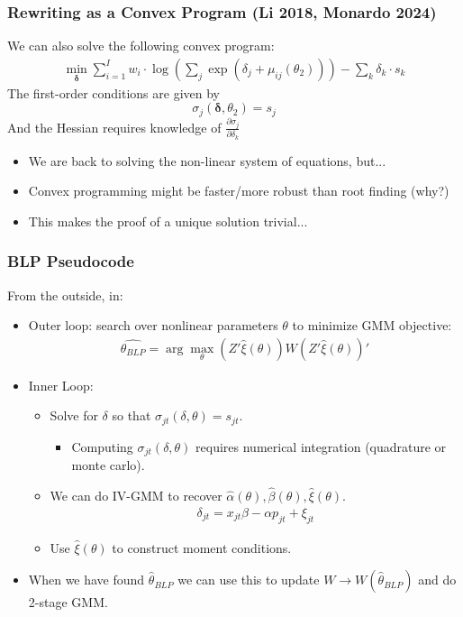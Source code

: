 \documentclass[aspectratio=169,10pt]{beamer}
\begin{document}
 \begin{frame}
\frametitle{Rewriting as a Convex Program (Li 2018, Monardo 2024)}
We can also solve the following convex program:
\begin{align*}
    \min_{\symbf{\delta}}  \sum_{i=1}^I w_i \cdot \log \left(\sum_{j} \exp\left(\delta_j  + \mu_{ij}(\theta_2) \right) \right) - \sum_k \delta_k \cdot s_{k}
\end{align*}
The first-order conditions are given by
$$\sigma_j(\symbf{\delta},\theta_2) = s_j$$
And the Hessian requires knowledge of $\frac{\partial \sigma_{j}}{\partial \delta_{k}}$
\begin{itemize}
    \item We are back to solving the non-linear system of equations, but...
    \item Convex programming might be faster/more robust than root finding (why?)
    \item This makes the proof of a unique solution trivial...
  \end{itemize}
 \end{frame}





 \begin{frame}
\frametitle{BLP Pseudocode}
\footnotesize
From the outside, in:
\begin{itemize}
\item Outer loop: search over nonlinear parameters $\theta$ to minimize GMM objective:
 \begin{align*}
 \widehat{\theta_{BLP}} = \arg \max_{\theta} (Z' \hat{\xi}(\theta)) W  (Z' \hat{\xi}(\theta))'
 \end{align*}
 \item Inner Loop:
 \begin{itemize}
\item Solve for $\delta$ so that $\sigma_{jt}(\delta,\theta) = s_{jt}$.
\begin{itemize}
\item Computing $\sigma_{jt}(\delta,\theta)$ requires numerical integration (quadrature or monte carlo).
\end{itemize}
 \item We can do IV-GMM to recover $\hat{\alpha}(\theta),\hat{\beta}(\theta),\hat{\xi}(\theta)$.
  \begin{align*}
\delta_{jt}= x_{jt} \beta -\alpha p_{jt}+  \xi_{jt}
 \end{align*}
  \item Use $\hat{\xi}(\theta)$ to construct moment conditions.
 \end{itemize}
 \item When we have found $\hat{\theta}_{BLP}$ we can use this to update $W \rightarrow W(\hat{\theta}_{BLP})$ and do 2-stage GMM.
 \end{itemize}
\end{frame}
\end{document}
